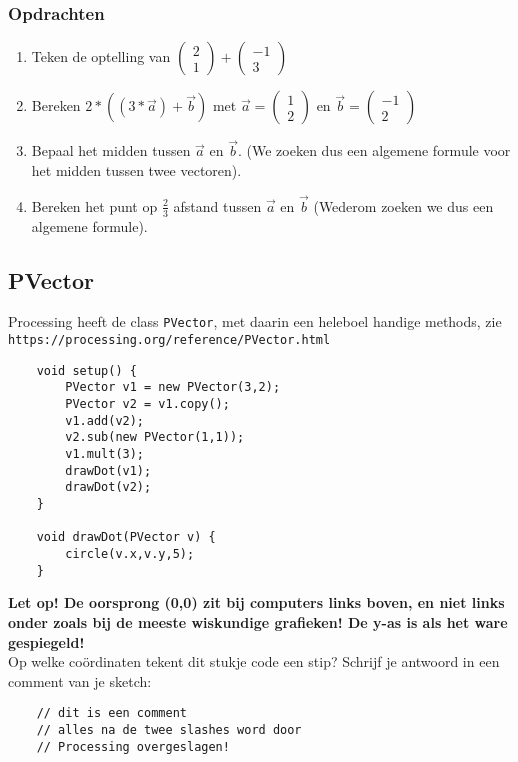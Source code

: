 \subsubsection{Opdrachten}
\begin{enumerate}
	\item Teken de optelling van $\begin{pmatrix}2\\1\end{pmatrix}+\begin{pmatrix}-1\\3\end{pmatrix}$
	\item Bereken $2*((3*\vec{a})+\vec{b})$ met $\vec{a}=\begin{pmatrix}1\\2\end{pmatrix}$ en $\vec{b} = \begin{pmatrix}-1\\2\end{pmatrix}$
	\item Bepaal het midden tussen $\vec{a}$ en $\vec{b}$. (We zoeken dus een algemene formule voor het midden tussen twee vectoren).
	\item Bereken het punt op $\frac{2}{3}$ afstand tussen $\vec{a}$ en $\vec{b}$ (Wederom zoeken we dus een algemene formule).
\end{enumerate}

\subsection{PVector}
Processing heeft de class \texttt{PVector}, met daarin een heleboel handige methods, zie \texttt{https://processing.org/reference/PVector.html}
\begin{lstlisting}
	void setup() {
		PVector v1 = new PVector(3,2);
		PVector v2 = v1.copy();
		v1.add(v2);
		v2.sub(new PVector(1,1));
		v1.mult(3);
		drawDot(v1);
		drawDot(v2);
	}
	
	void drawDot(PVector v) {
		circle(v.x,v.y,5);
	}
\end{lstlisting}
\textbf{Let op! De oorsprong (0,0) zit bij computers links boven, en niet links onder zoals bij de meeste wiskundige grafieken! De y-as is als het ware gespiegeld!}\\
Op welke co\"ordinaten tekent dit stukje code een stip?
Schrijf je antwoord in een comment van je sketch:
\begin{lstlisting}
	// dit is een comment
	// alles na de twee slashes word door 
	// Processing overgeslagen!
\end{lstlisting}

